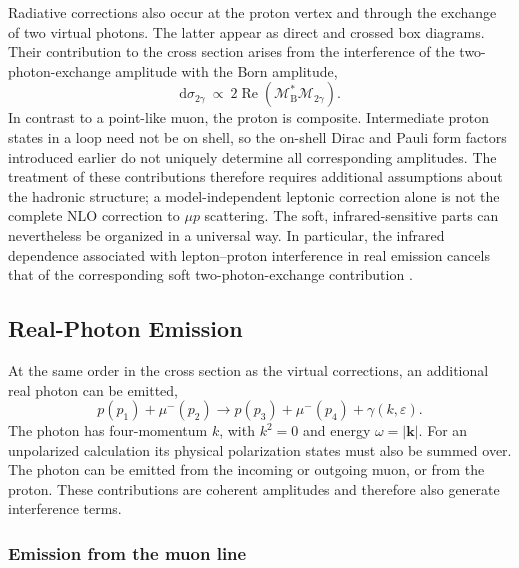 Radiative corrections also occur at the proton vertex and through the
exchange of two virtual photons. The latter appear as direct and crossed
box diagrams. Their contribution to the cross section arises from the
interference of the two-photon-exchange amplitude with the Born amplitude,
\begin{equation}
 \mathrm d\sigma_{2\gamma}\ \propto\
 2\operatorname{Re}\!\left(
    \mathcal M_{\mathrm B}^{*}\mathcal M_{2\gamma}
 \right).
\end{equation}
In contrast to a point-like muon, the proton is composite. Intermediate
proton states in a loop need not be on shell, so the on-shell Dirac and Pauli
form factors introduced earlier do not uniquely determine all corresponding
amplitudes. The treatment of these contributions therefore requires
additional assumptions about the hadronic structure; a model-independent
leptonic correction alone is not the complete NLO correction to $\mu p$
scattering. The soft, infrared-sensitive parts can nevertheless be organized
in a universal way. In particular, the infrared dependence associated with
lepton--proton interference in real emission cancels that of the corresponding
soft two-photon-exchange contribution \cite{Vanderhaeghen2000}.

\subsection{Real-Photon Emission}
\label{subsec:real_nlo}

At the same order in the cross section as the virtual corrections, an
additional real photon can be emitted,
\begin{equation}
 p(p_1)+\mu^-(p_2)
   \longrightarrow p(p_3)+\mu^-(p_4)+\gamma(k,\varepsilon).
 \label{eq:nlo_three_body}
\end{equation}
The photon has four-momentum $k$, with $k^2=0$ and energy
$\omega=|\boldsymbol{k}|$. For an unpolarized calculation its physical
polarization states must also be summed over. The photon can be emitted
from the incoming or outgoing muon, or from the proton. These contributions
are coherent amplitudes and therefore also generate interference terms.

\subsubsection{Emission from the muon line}


